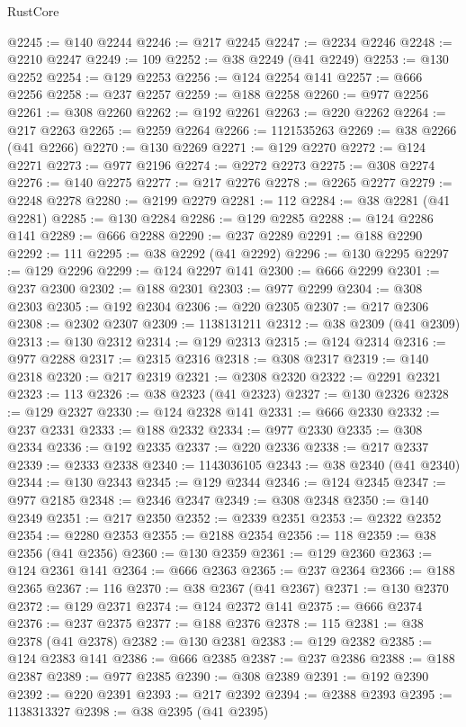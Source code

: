 \begin{lexlean}{RustCore}
\begin{coremodule}
@2245 := @140 @2244
@2246 := @217 @2245
@2247 := @2234 @2246
@2248 := @2210 @2247
@2249 := 109
@2252 := @38 @2249 (@41 @2249)
@2253 := @130 @2252
@2254 := @129 @2253
@2256 := @124 @2254 @141
@2257 := @666 @2256
@2258 := @237 @2257
@2259 := @188 @2258
@2260 := @977 @2256
@2261 := @308 @2260
@2262 := @192 @2261
@2263 := @220 @2262
@2264 := @217 @2263
@2265 := @2259 @2264
@2266 := 1121535263
@2269 := @38 @2266 (@41 @2266)
@2270 := @130 @2269
@2271 := @129 @2270
@2272 := @124 @2271
@2273 := @977 @2196
@2274 := @2272 @2273
@2275 := @308 @2274
@2276 := @140 @2275
@2277 := @217 @2276
@2278 := @2265 @2277
@2279 := @2248 @2278
@2280 := @2199 @2279
@2281 := 112
@2284 := @38 @2281 (@41 @2281)
@2285 := @130 @2284
@2286 := @129 @2285
@2288 := @124 @2286 @141
@2289 := @666 @2288
@2290 := @237 @2289
@2291 := @188 @2290
@2292 := 111
@2295 := @38 @2292 (@41 @2292)
@2296 := @130 @2295
@2297 := @129 @2296
@2299 := @124 @2297 @141
@2300 := @666 @2299
@2301 := @237 @2300
@2302 := @188 @2301
@2303 := @977 @2299
@2304 := @308 @2303
@2305 := @192 @2304
@2306 := @220 @2305
@2307 := @217 @2306
@2308 := @2302 @2307
@2309 := 1138131211
@2312 := @38 @2309 (@41 @2309)
@2313 := @130 @2312
@2314 := @129 @2313
@2315 := @124 @2314
@2316 := @977 @2288
@2317 := @2315 @2316
@2318 := @308 @2317
@2319 := @140 @2318
@2320 := @217 @2319
@2321 := @2308 @2320
@2322 := @2291 @2321
@2323 := 113
@2326 := @38 @2323 (@41 @2323)
@2327 := @130 @2326
@2328 := @129 @2327
@2330 := @124 @2328 @141
@2331 := @666 @2330
@2332 := @237 @2331
@2333 := @188 @2332
@2334 := @977 @2330
@2335 := @308 @2334
@2336 := @192 @2335
@2337 := @220 @2336
@2338 := @217 @2337
@2339 := @2333 @2338
@2340 := 1143036105
@2343 := @38 @2340 (@41 @2340)
@2344 := @130 @2343
@2345 := @129 @2344
@2346 := @124 @2345
@2347 := @977 @2185
@2348 := @2346 @2347
@2349 := @308 @2348
@2350 := @140 @2349
@2351 := @217 @2350
@2352 := @2339 @2351
@2353 := @2322 @2352
@2354 := @2280 @2353
@2355 := @2188 @2354
@2356 := 118
@2359 := @38 @2356 (@41 @2356)
@2360 := @130 @2359
@2361 := @129 @2360
@2363 := @124 @2361 @141
@2364 := @666 @2363
@2365 := @237 @2364
@2366 := @188 @2365
@2367 := 116
@2370 := @38 @2367 (@41 @2367)
@2371 := @130 @2370
@2372 := @129 @2371
@2374 := @124 @2372 @141
@2375 := @666 @2374
@2376 := @237 @2375
@2377 := @188 @2376
@2378 := 115
@2381 := @38 @2378 (@41 @2378)
@2382 := @130 @2381
@2383 := @129 @2382
@2385 := @124 @2383 @141
@2386 := @666 @2385
@2387 := @237 @2386
@2388 := @188 @2387
@2389 := @977 @2385
@2390 := @308 @2389
@2391 := @192 @2390
@2392 := @220 @2391
@2393 := @217 @2392
@2394 := @2388 @2393
@2395 := 1138313327
@2398 := @38 @2395 (@41 @2395)

\end{coremodule}
\end{lexlean}
